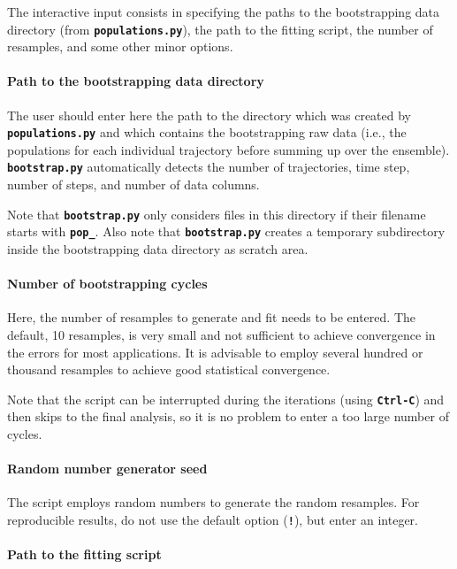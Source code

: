 \documentclass[a4paper,10pt,DIV=15,openany]{scrbook}
\newcommand{\ttt}[1]{\textbf{\texttt{#1}}}
\begin{document}
The interactive input consists in specifying the paths to the bootstrapping data directory (from \ttt{populations.py}), the path to the fitting script, the number of resamples, and some other minor options.

\paragraph{Path to the bootstrapping data directory}

The user should enter here the path to the directory which was created by \ttt{populations.py} and which contains the bootstrapping raw data (i.e., the populations for each individual trajectory before summing up over the ensemble).
\ttt{bootstrap.py} automatically detects the number of trajectories, time step, number of steps, and number of data columns.

Note that \ttt{bootstrap.py} only considers files in this directory if their filename starts with \ttt{pop\_}.
Also note that \ttt{bootstrap.py} creates a temporary subdirectory inside the bootstrapping data directory as scratch area.

\paragraph{Number of bootstrapping cycles}

Here, the number of resamples to generate and fit needs to be entered.
The default, 10 resamples, is very small and not sufficient to achieve convergence in the errors for most applications.
It is advisable to employ several hundred or thousand resamples to achieve good statistical convergence.

Note that the script can be interrupted during the iterations (using \ttt{Ctrl-C}) and then skips to the final analysis, so it is no problem to enter a too large number of cycles.

\paragraph{Random number generator seed}

The script employs random numbers to generate the random resamples.
For reproducible results, do not use the default option (\ttt{!}), but enter an integer.

\paragraph{Path to the fitting script}
\end{document}
